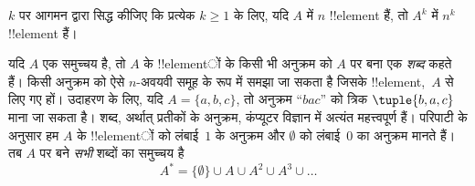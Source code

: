 \documentclass[../../../include/open-logic-section]{subfiles}
\begin{document}
\begin{prob}
$k$ पर आगमन द्वारा सिद्ध कीजिए कि प्रत्येक $k \ge 1$ के लिए, यदि $A$
में $n$ !!{element} हैं, तो $A^k$ में $n^k$ !!{element} हैं।
\end{prob}

\begin{ex}
यदि $A$ एक समुच्चय है, तो $A$ के !!{element}ों के किसी भी अनुक्रम को
$A$ पर बना एक \emph{शब्द} कहते हैं। किसी अनुक्रम को ऐसे $n$-अवयवी समूह
के रूप में समझा जा सकता है जिसके !!{element},~$A$ से लिए गए हों। उदाहरण के लिए, यदि
$A = \{a, b, c\}$, तो अनुक्रम ``$bac$'' को त्रिक
$\tuple{b, a, c}$ माना जा सकता है। शब्द, अर्थात् प्रतीकों के अनुक्रम,
कंप्यूटर विज्ञान में अत्यंत महत्त्वपूर्ण हैं। परिपाटी के अनुसार हम $A$
के !!{element}ों को लंबाई~$1$ के अनुक्रम और $\emptyset$ को लंबाई~$0$
का अनुक्रम मानते हैं। तब $A$ पर बने \emph{सभी} शब्दों का समुच्चय है
\[
A^* = \{\emptyset\} \cup A \cup A^2 \cup A^3 \cup \dots
\]
\end{ex}
\end{document}

